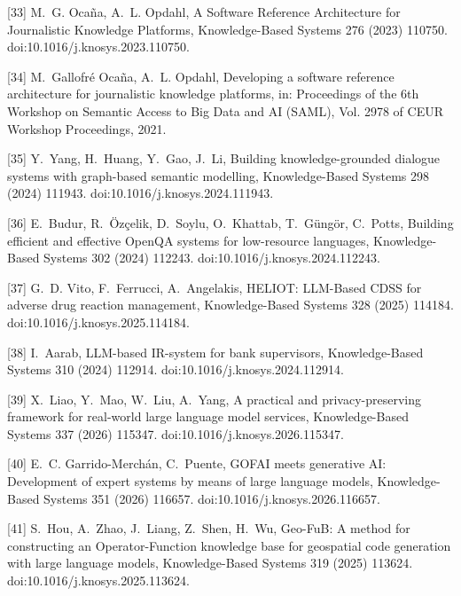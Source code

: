 \documentclass[11pt]{article}
\begin{document}
[33] 
M.~G. Oca{\~n}a, A.~L. Opdahl, {A Software Reference Architecture for
  Journalistic Knowledge Platforms}, Knowledge-Based Systems 276 (2023) 110750.
  doi:10.1016/j.knosys.2023.110750.



[34] 
M.~Gallofr\'e Oca\~na, A.~L. Opdahl, Developing a software reference
  architecture for journalistic knowledge platforms, in: Proceedings of the 6th
  Workshop on Semantic Access to Big Data and AI (SAML), Vol. 2978 of CEUR
  Workshop Proceedings, 2021.



[35] 
Y.~Yang, H.~Huang, Y.~Gao, J.~Li, {Building knowledge-grounded dialogue systems
  with graph-based semantic modelling}, Knowledge-Based Systems 298 (2024)
  111943.
  doi:10.1016/j.knosys.2024.111943.



[36] 
E.~Budur, R.~{\"O}z{\c{c}}elik, D.~Soylu, O.~Khattab, T.~G{\"u}ng{\"o}r,
  C.~Potts, {Building efficient and effective OpenQA systems for low-resource
  languages}, Knowledge-Based Systems 302 (2024) 112243.
  doi:10.1016/j.knosys.2024.112243.



[37] 
G.~D. Vito, F.~Ferrucci, A.~Angelakis, {HELIOT: LLM-Based CDSS for adverse drug
  reaction management}, Knowledge-Based Systems 328 (2025) 114184.
  doi:10.1016/j.knosys.2025.114184.



[38] 
I.~Aarab, {LLM-based IR-system for bank supervisors}, Knowledge-Based Systems
  310 (2024) 112914.
  doi:10.1016/j.knosys.2024.112914.



[39] 
X.~Liao, Y.~Mao, W.~Liu, A.~Yang, {A practical and privacy-preserving framework
  for real-world large language model services}, Knowledge-Based Systems 337
  (2026) 115347.
  doi:10.1016/j.knosys.2026.115347.



[40] 
E.~C. Garrido-Merch{\'a}n, C.~Puente, {GOFAI meets generative AI: Development
  of expert systems by means of large language models}, Knowledge-Based Systems
  351 (2026) 116657.
  doi:10.1016/j.knosys.2026.116657.



[41] 
S.~Hou, A.~Zhao, J.~Liang, Z.~Shen, H.~Wu, {Geo-FuB: A method for constructing
  an Operator-Function knowledge base for geospatial code generation with large
  language models}, Knowledge-Based Systems 319 (2025) 113624.
  doi:10.1016/j.knosys.2025.113624.
\end{document}
